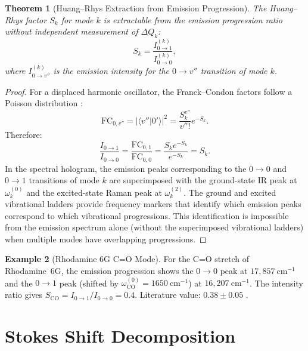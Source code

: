 \documentclass[11pt,twocolumn,a4paper]{article}
\newtheorem{theorem}{Theorem}[section]
\theoremstyle{definition}
\newtheorem{example}[theorem]{Example}
\theoremstyle{remark}
\begin{document}
\begin{theorem}[Huang--Rhys Extraction from Emission Progression]
\label{thm:hr_extract}
The Huang--Rhys factor $S_k$ for mode $k$ is extractable from the emission progression ratio without independent measurement of $\Delta Q_k$:
\begin{equation}
S_k = \frac{I_{0 \to 1}^{(k)}}{I_{0 \to 0}^{(k)}},
\end{equation}
where $I_{0 \to v''}^{(k)}$ is the emission intensity for the $0 \to v''$ transition of mode $k$.
\end{theorem}

\begin{proof}
For a displaced harmonic oscillator, the Franck--Condon factors follow a Poisson distribution \citep{huangrhys1950}:
\begin{equation}
\mathrm{FC}_{0,v''} = |\langle v'' | 0' \rangle|^2 = \frac{S_k^{v''}}{v''!} e^{-S_k}.
\end{equation}
Therefore:
\begin{equation}
\frac{I_{0\to 1}}{I_{0\to 0}} = \frac{\mathrm{FC}_{0,1}}{\mathrm{FC}_{0,0}} = \frac{S_k e^{-S_k}}{e^{-S_k}} = S_k.
\end{equation}
In the spectral hologram, the emission peaks corresponding to the $0 \to 0$ and $0 \to 1$ transitions of mode $k$ are superimposed with the ground-state IR peak at $\omega_k^{(0)}$ and the excited-state Raman peak at $\omega_k^{(2)}$. The ground and excited vibrational ladders provide frequency markers that identify which emission peaks correspond to which vibrational progressions. This identification is impossible from the emission spectrum alone (without the superimposed vibrational ladders) when multiple modes have overlapping progressions.
\end{proof}

\begin{example}[Rhodamine 6G C=O Mode]
\label{ex:hr_rhodamine}
For the C=O stretch of Rhodamine~6G, the emission progression shows the $0 \to 0$ peak at $17{,}857~\mathrm{cm}^{-1}$ and the $0 \to 1$ peak (shifted by $\omega_{\mathrm{CO}}^{(0)} = 1650~\mathrm{cm}^{-1}$) at $16{,}207~\mathrm{cm}^{-1}$. The intensity ratio gives $S_{\mathrm{CO}} = I_{0\to 1}/I_{0\to 0} = 0.4$. Literature value: $0.38 \pm 0.05$ \citep{kubin1982, magde1999}.
\end{example}

\section{Stokes Shift Decomposition}
\label{sec:stokes}
\end{document}
